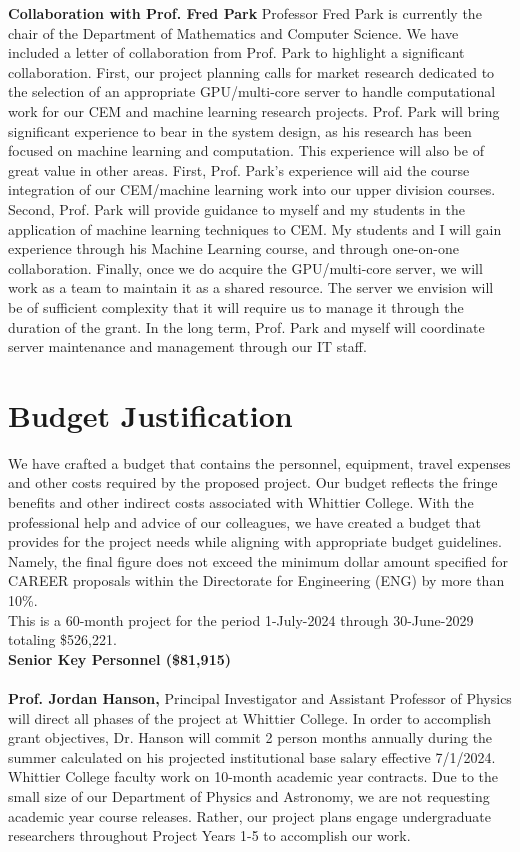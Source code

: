 \documentclass[11pt]{amsart}
\begin{document}
\textbf{Collaboration with Prof. Fred Park} Professor Fred Park is currently the chair of the Department of Mathematics and Computer Science.  We have included a letter of collaboration from Prof. Park to highlight a significant collaboration.  First, our project planning calls for market research dedicated to the selection of an appropriate GPU/multi-core server to handle computational work for our CEM and machine learning research projects.  Prof. Park will bring significant experience to bear in the system design, as his research has been focused on machine learning and computation.  This experience will also be of great value in other areas.  First, Prof. Park's experience will aid the course integration of our CEM/machine learning work into our upper division courses.  Second, Prof. Park will provide guidance to myself and my students in the application of machine learning techniques to CEM.  My students and I will gain experience through his Machine Learning course, and through one-on-one collaboration.  Finally, once we do acquire the GPU/multi-core server, we will work as a team to maintain it as a shared resource.  The server we envision will be of sufficient complexity that it will require us to manage it through the duration of the grant.  In the long term, Prof. Park and myself will coordinate server maintenance and management through our IT staff.

\clearpage

\section{Budget Justification}

We have crafted a budget that contains the personnel, equipment, travel expenses and other costs required by the proposed project. Our budget reflects the fringe benefits and other indirect costs associated with Whittier College. With the professional help and advice of our colleagues, we have created a budget that provides for the project needs while aligning with appropriate budget guidelines. Namely, the final figure does not exceed the minimum dollar amount specified for CAREER proposals within the Directorate for Engineering (ENG) by more than 10\%. \\

\noindent
This is a 60-month project for the period 1-July-2024 through 30-June-2029 totaling \$526,221. \\

\noindent
\textbf{Senior Key Personnel (\$81,915)} \\ \\
\textbf{Prof. Jordan Hanson,} Principal Investigator and Assistant Professor of Physics will direct all phases of the project at Whittier College. In order to accomplish grant objectives, Dr. Hanson will commit 2 person months annually during the summer calculated on his projected institutional base salary effective 7/1/2024. Whittier College faculty work on 10-month academic year contracts. Due to the small size of our Department of Physics and Astronomy, we are not requesting academic year course releases. Rather, our project plans engage undergraduate researchers throughout Project Years 1-5 to accomplish our work. \\
\end{document}
